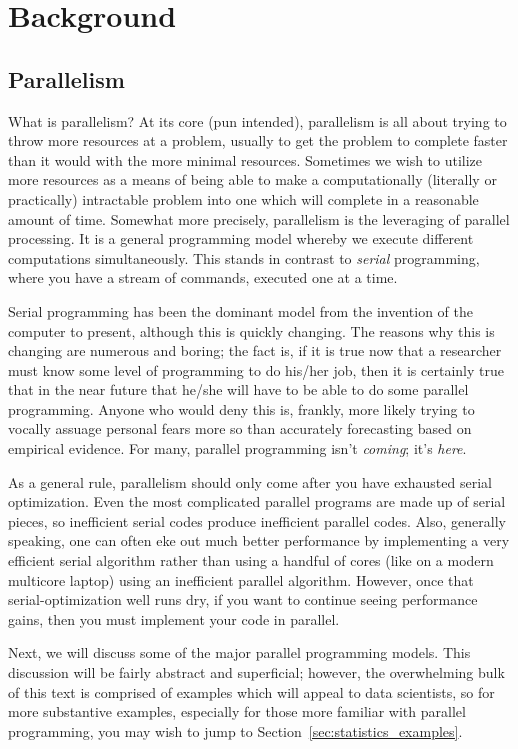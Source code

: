 \chapter{Background}
\label{sec:bg}


\section{Parallelism}
What is parallelism? At its core (pun intended), parallelism is all about
trying to throw more resources at a problem, usually to get the problem to
complete faster than it would with the more minimal resources. Sometimes
we wish to utilize more resources as a means of being able to make a
computationally (literally or practically) intractable problem into one which
will complete in a reasonable amount of time. Somewhat more precisely,
parallelism is the leveraging of parallel processing. It is a general
programming model whereby we execute different computations simultaneously.
This stands in contrast to \emph{serial} programming, where you have a stream
of commands, executed one at a time.

Serial programming has been the dominant model from the invention of the
computer to present, although this is quickly changing. The reasons why
this is changing are numerous and boring; the fact is, if it is true now
that a researcher must know some level of programming to do his/her job,
then it is certainly true that in the near future that he/she will have to
be able to do some parallel programming. Anyone who would deny this is,
frankly, more likely trying to vocally assuage personal fears more so than
accurately forecasting based on empirical evidence. For many, parallel
programming isn't \emph{coming}; it's \emph{here}.  

As a general rule, parallelism should only come after you have exhausted
serial optimization. Even the most complicated parallel programs are made
up of serial pieces, so inefficient serial codes produce inefficient parallel
codes. Also, generally speaking, one can often eke out much better performance
by implementing a very efficient serial algorithm rather than using a handful
of cores (like on a modern multicore laptop) using an inefficient parallel
algorithm. However, once that serial-optimization well runs dry, if you want
to continue seeing performance gains, then you must implement your code in
parallel.  

Next, we will discuss some of the major parallel programming models. This
discussion will be fairly abstract and superficial; however, the overwhelming
bulk of this text is comprised of examples which will appeal to data
scientists, so for more substantive examples, especially for those more
familiar with parallel programming, you may wish to jump to
Section~\ref{sec:statistics_examples}.



